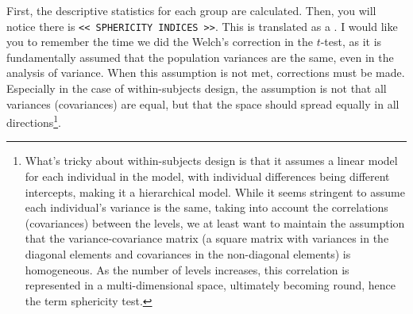 \documentclass{ltjbook}
\begin{document}
First, the descriptive statistics for each group are calculated. Then, you will notice there is \verb|<< SPHERICITY INDICES >>|. This is translated as a . I would like you to remember the time we did the Welch's correction in the $t$-test, as it is fundamentally assumed that the population variances are the same, even in the analysis of variance. When this assumption is not met, corrections must be made. Especially in the case of within-subjects design, the assumption is not that all variances (covariances) are equal, but that the space should spread equally in all directions\footnote{What's tricky about within-subjects design is that it assumes a linear model for each individual in the model, with individual differences being different intercepts, making it a hierarchical model. While it seems stringent to assume each individual's variance is the same, taking into account the correlations (covariances) between the levels, we at least want to maintain the assumption that the variance-covariance matrix (a square matrix with variances in the diagonal elements and covariances in the non-diagonal elements) is homogeneous. As the number of levels increases, this correlation is represented in a multi-dimensional space, ultimately becoming round, hence the term sphericity test. }.

\end{document}
